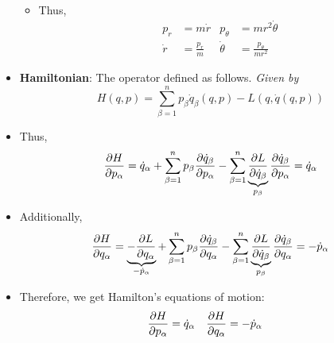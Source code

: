 \documentclass[../notes.tex]{subfiles}
\begin{document}
\begin{itemize}
\begin{itemize}
\begin{equation*}
        \end{equation*}
        \item Thus,
        \begin{align*}
            p_r &= m\dot{r}&
                p_\theta &= mr^2\dot{\theta}\\
            \dot{r} &= \frac{p_r}{m}&
                \dot{\theta} &= \frac{p_\theta}{mr^2}
        \end{align*}
    \end{itemize}
    \item \textbf{Hamiltonian}: The operator defined as follows. \emph{Given by}
    \begin{equation*}
        H(q,p) = \sum_{\beta=1}^np_\beta\dot{q}_\beta(q,p)-L(q,\dot{q}(q,p))
    \end{equation*}
    \item Thus,
    \begin{equation*}
        \pdv{H}{p_\alpha} = \dot{q}_\alpha+\sum_{\beta=1}^np_\beta\pdv{\dot{q}_\beta}{p_\alpha}-\sum_{\beta=1}^n\underbrace{\pdv{L}{\dot{q}_\beta}}_{p_\beta}\pdv{\dot{q}_\beta}{p_\alpha}
        = \dot{q}_\alpha
    \end{equation*}
    \item Additionally,
    \begin{equation*}
        \pdv{H}{q_\alpha} = \underbrace{-\pdv{L}{q_\alpha}}_{-\dot{p}_\alpha}+\sum_{\beta=1}^np_\beta\pdv{\dot{q}_\beta}{q_\alpha}-\sum_{\beta=1}^n\underbrace{\pdv{L}{\dot{q}_\beta}}_{p_\beta}\pdv{\dot{q}_\beta}{q_\alpha}
        = -\dot{p}_\alpha
    \end{equation*}
    \item Therefore, we get Hamilton's equations of motion:
    \begin{align*}
        \pdv{H}{p_\alpha} &= \dot{q}_\alpha&
        \pdv{H}{q_\alpha} &= -\dot{p}_\alpha
    \end{align*}
\end{itemize}
\end{document}
